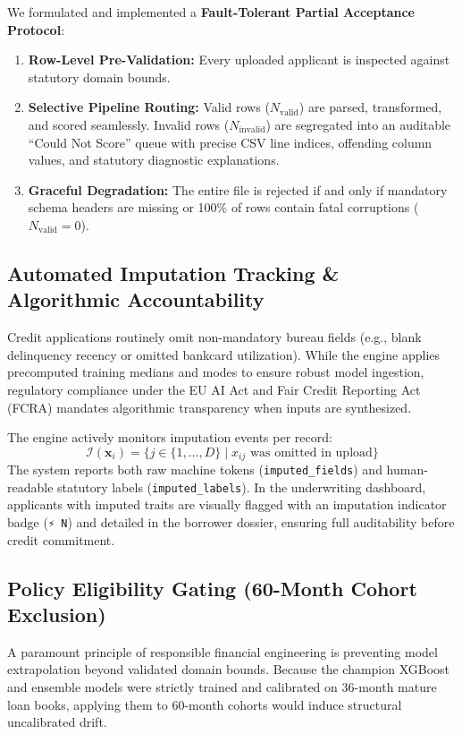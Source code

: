 \documentclass[conference]{IEEEtran}
\begin{document}
We formulated and implemented a \textbf{Fault-Tolerant Partial Acceptance Protocol}:
\begin{enumerate}
    \item \textbf{Row-Level Pre-Validation:} Every uploaded applicant is inspected against statutory domain bounds.
    \item \textbf{Selective Pipeline Routing:} Valid rows ($N_{\text{valid}}$) are parsed, transformed, and scored seamlessly. Invalid rows ($N_{\text{invalid}}$) are segregated into an auditable ``Could Not Score'' queue with precise CSV line indices, offending column values, and statutory diagnostic explanations.
    \item \textbf{Graceful Degradation:} The entire file is rejected if and only if mandatory schema headers are missing or 100\% of rows contain fatal corruptions ($N_{\text{valid}} = 0$).
\end{enumerate}

\subsection{Automated Imputation Tracking \& Algorithmic Accountability}
Credit applications routinely omit non-mandatory bureau fields (e.g., blank delinquency recency or omitted bankcard utilization). While the engine applies precomputed training medians and modes to ensure robust model ingestion, regulatory compliance under the EU AI Act and Fair Credit Reporting Act (FCRA) mandates algorithmic transparency when inputs are synthesized.

The engine actively monitors imputation events per record:
\begin{equation}
\mathcal{I}(\mathbf{x}_i) = \{j \in \{1,\dots,D\} \mid x_{ij} \text{ was omitted in upload}\}
\end{equation}
The system reports both raw machine tokens (\texttt{imputed\_fields}) and human-readable statutory labels (\texttt{imputed\_labels}). In the underwriting dashboard, applicants with imputed traits are visually flagged with an imputation indicator badge (\texttt{⚡ N}) and detailed in the borrower dossier, ensuring full auditability before credit commitment.

\subsection{Policy Eligibility Gating (60-Month Cohort Exclusion)}
A paramount principle of responsible financial engineering is preventing model extrapolation beyond validated domain bounds. Because the champion XGBoost and ensemble models were strictly trained and calibrated on 36-month mature loan books, applying them to 60-month cohorts would induce structural uncalibrated drift.
\end{document}
